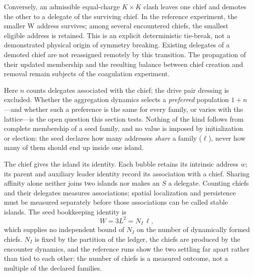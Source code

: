 \documentclass[a4paper]{article}
\begin{document}
Conversely, an admissible equal-charge $K\times K$ clash leaves one chief and demotes the other to a delegate of the surviving chief. In the reference experiment, the smaller W address survives; among several encountered chiefs, the smallest eligible address is retained. This is an explicit deterministic tie-break, not a demonstrated physical origin of symmetry breaking. Existing delegates of a demoted chief are not reassigned remotely by this transition. The propagation of their updated membership and the resulting balance between chief creation and removal remain subjects of the coagulation experiment.

Here $n$ counts delegates associated with the chief; the drive pair dressing is excluded. Whether the aggregation dynamics selects a \emph{preferred} population $1+n$---and whether such a preference is the same for every family, or varies with the lattice---is the open question this section tests. Nothing of the kind follows from complete membership of a seed family, and no value is imposed by initialization or election: the seed declares how many addresses \emph{share} a family ($\ell$), never how many of them should end up inside one island.

The chief gives the island its identity. Each bubble retains its intrinsic address $w$; its parent and auxiliary leader identity record its association with a chief. Sharing affinity alone neither joins two islands nor makes an $S$ a delegate. Counting chiefs and their delegates measures associations; spatial localization and persistence must be measured separately before those associations can be called stable islands. The seed bookkeeping identity is
\begin{equation}
W=3L^2=N_I\,\ell,
\end{equation}
which supplies no independent bound of $N_I$ on the number of dynamically formed chiefs.  $N_I$ is fixed by the partition of the ledger, the chiefs are produced by the encounter dynamics, and the reference runs show the two settling far apart rather than tied to each other: the number of chiefs is a measured outcome, not a multiple of the declared families.
\end{document}
